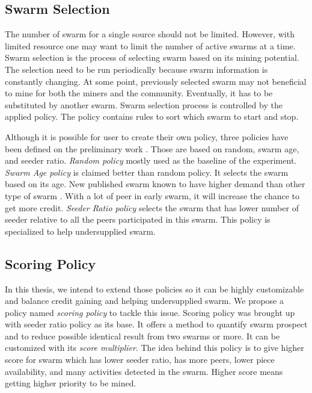 \subsection{Swarm Selection}
\label{section:swarmselect}
The number of swarm for a single source should not be limited. However, with limited resource one may want to limit the number of active swarms at a time. Swarm selection is the process of selecting swarm based on its mining potential. The selection need to be run periodically because swarm information is constantly changing. At some point, previously selected swarm may not beneficial to mine for both the miners and the community. Eventually, it has to be substituted by another swarm. Swarm selection process is controlled by the applied policy. The policy contains rules to sort which swarm to start and stop.

Although it is possible for user to create their own policy, three policies have been defined on the preliminary work \cite{2015:creditmining:capota}. Those are based on random, swarm age, and seeder ratio. \textit{Random policy} mostly used as the baseline of the experiment. \textit{Swarm Age policy} is claimed better than random policy. It selects the swarm based on its age. New published swarm known to have higher demand than other type of swarm \cite{2012:economicbt:kash}. With a lot of peer in early swarm, it will increase the chance to get more credit. \textit{Seeder Ratio policy} selects the swarm that has lower number of seeder relative to all the peers participated in this swarm. This policy is specialized to help undersupplied swarm. 

\subsection{Scoring Policy}
\label{section:scorepolicy}
In this thesis, we intend to extend those policies so it can be highly customizable and balance credit gaining and helping undersupplied swarm. We propose a policy named \textit{scoring policy} to tackle this issue. Scoring policy was brought up with seeder ratio policy as its base. It offers a method to quantify swarm prospect and to reduce possible identical result from two swarms or more. It can be customized with its \textit{score multiplier}. The idea behind this policy is to give higher score for swarm which has lower seeder ratio, has more peers, lower piece availability, and many activities detected in the swarm. Higher score means getting higher priority to be mined.

